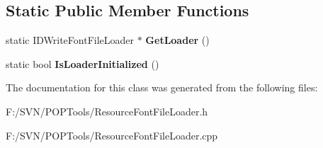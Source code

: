 \subsection*{Static Public Member Functions}
\begin{DoxyCompactItemize}
\item 
\hypertarget{class_resource_font_file_loader_a89a160a1425d040a5699236dfd7d7fdc}{static I\-D\-Write\-Font\-File\-Loader $\ast$ {\bfseries Get\-Loader} ()}\label{class_resource_font_file_loader_a89a160a1425d040a5699236dfd7d7fdc}

\item 
\hypertarget{class_resource_font_file_loader_a24b04152fa11c8dd80bed6a8eaa2cb0b}{static bool {\bfseries Is\-Loader\-Initialized} ()}\label{class_resource_font_file_loader_a24b04152fa11c8dd80bed6a8eaa2cb0b}

\end{DoxyCompactItemize}


The documentation for this class was generated from the following files\-:\begin{DoxyCompactItemize}
\item 
F\-:/\-S\-V\-N/\-P\-O\-P\-Tools/Resource\-Font\-File\-Loader.\-h\item 
F\-:/\-S\-V\-N/\-P\-O\-P\-Tools/Resource\-Font\-File\-Loader.\-cpp\end{DoxyCompactItemize}
